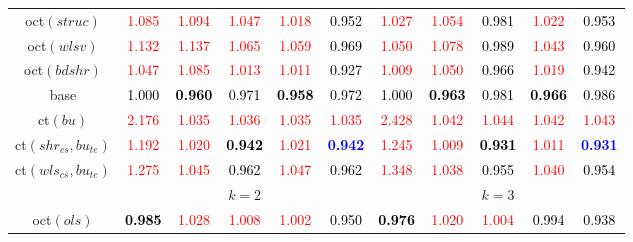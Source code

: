 \begin{tabular}[t]{c|>{}cccc>{}c|ccccc}
oct$(struc)$ & \textcolor{red}{1.085} & \textcolor{red}{1.094} & \textcolor{red}{1.047} & \textcolor{red}{1.018} & \textcolor{black}{0.952} & \textcolor{red}{1.027} & \textcolor{red}{1.054} & \textcolor{black}{0.981} & \textcolor{red}{1.022} & \textcolor{black}{0.953}\\
oct$(wlsv)$ & \textcolor{red}{1.132} & \textcolor{red}{1.137} & \textcolor{red}{1.065} & \textcolor{red}{1.059} & \textcolor{black}{0.969} & \textcolor{red}{1.050} & \textcolor{red}{1.078} & \textcolor{black}{0.989} & \textcolor{red}{1.043} & \textcolor{black}{0.960}\\
oct$(bdshr)$ & \textcolor{red}{1.047} & \textcolor{red}{1.085} & \textcolor{red}{1.013} & \textcolor{red}{1.011} & \textcolor{black}{0.927} & \textcolor{red}{1.009} & \textcolor{red}{1.050} & \textcolor{black}{0.966} & \textcolor{red}{1.019} & \textcolor{black}{0.942}\\
base & \textcolor{black}{1.000} & \textcolor{black}{\textbf{0.960}} & \textcolor{black}{0.971} & \textcolor{black}{\textbf{0.958}} & \textcolor{black}{0.972} & \textcolor{black}{1.000} & \textcolor{black}{\textbf{0.963}} & \textcolor{black}{0.981} & \textcolor{black}{\textbf{0.966}} & \textcolor{black}{0.986}\\
ct$(bu)$ & \textcolor{red}{2.176} & \textcolor{red}{1.035} & \textcolor{red}{1.036} & \textcolor{red}{1.035} & \textcolor{red}{1.035} & \textcolor{red}{2.428} & \textcolor{red}{1.042} & \textcolor{red}{1.044} & \textcolor{red}{1.042} & \textcolor{red}{1.043}\\
ct$(shr_{cs}, bu_{te})$ & \textcolor{red}{1.192} & \textcolor{red}{1.020} & \textcolor{black}{\textbf{0.942}} & \textcolor{red}{1.021} & \textcolor{blue}{\textbf{0.942}} & \textcolor{red}{1.245} & \textcolor{red}{1.009} & \textcolor{black}{\textbf{0.931}} & \textcolor{red}{1.011} & \textcolor{blue}{\textbf{0.931}}\\
ct$(wls_{cs}, bu_{te})$ & \textcolor{red}{1.275} & \textcolor{red}{1.045} & \textcolor{black}{0.962} & \textcolor{red}{1.047} & \textcolor{black}{0.962} & \textcolor{red}{1.348} & \textcolor{red}{1.038} & \textcolor{black}{0.955} & \textcolor{red}{1.040} & \textcolor{black}{0.954}\\
\addlinespace[0.3em]
\multicolumn{1}{c}{} & \multicolumn{5}{c}{\textbf{$k = 2$}} & \multicolumn{5}{c}{\textbf{$k = 3$}}\\
oct$(ols)$ & \textcolor{black}{\textbf{0.985}} & \textcolor{red}{1.028} & \textcolor{red}{1.008} & \textcolor{red}{1.002} & \textcolor{black}{0.950} & \textcolor{black}{\textbf{0.976}} & \textcolor{red}{1.020} & \textcolor{red}{1.004} & \textcolor{black}{0.994} & \textcolor{black}{0.938}\\

\end{tabular}

